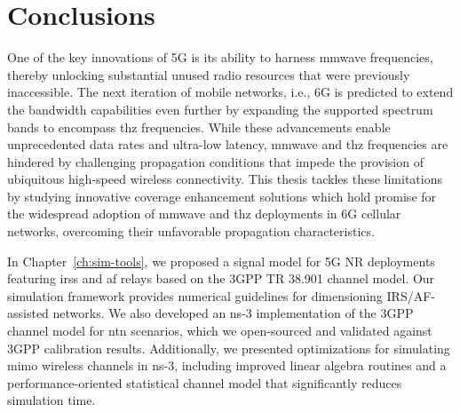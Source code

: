 \chapter{Conclusions}
\label{ch:concl}

One of the key innovations of 5G is its ability to harness \gls{mmwave} frequencies, thereby unlocking substantial unused radio resources that were previously inaccessible. The next iteration of mobile networks, i.e., 6G is predicted to extend the bandwidth capabilities even further by expanding the supported spectrum bands to encompass \gls{thz} frequencies. 
While these advancements enable unprecedented data rates and ultra-low latency, \gls{mmwave} and \gls{thz} frequencies are hindered by challenging propagation conditions that impede the provision of ubiquitous high-speed wireless connectivity.
This thesis tackles these limitations by studying innovative coverage enhancement solutions which hold promise for the widespread adoption of \gls{mmwave} and \gls{thz} deployments in 6G cellular networks, overcoming their unfavorable propagation characteristics.

In Chapter~\ref{ch:sim-tools}, we proposed a signal model for 5G NR deployments featuring \glspl{irs} and \gls{af} relays based on the 3GPP TR 38.901 channel model. Our simulation framework provides numerical guidelines for dimensioning IRS/AF-assisted networks. We also developed an ns-3 implementation of the 3GPP channel model for \gls{ntn} scenarios, which we open-sourced and validated against 3GPP calibration results. Additionally, we presented optimizations for simulating \gls{mimo} wireless channels in ns-3, including improved linear algebra routines and a performance-oriented statistical channel model that significantly reduces simulation time.


